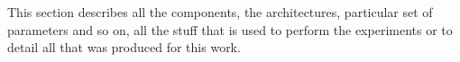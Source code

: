 \documentclass[../00_Main.tex]{subfiles}
\begin{document}
This section describes all the components, the architectures, particular set of parameters and so on, all the stuff that is used to perform the experiments or to detail all that was produced for this work.

\biblio %
\end{document}
